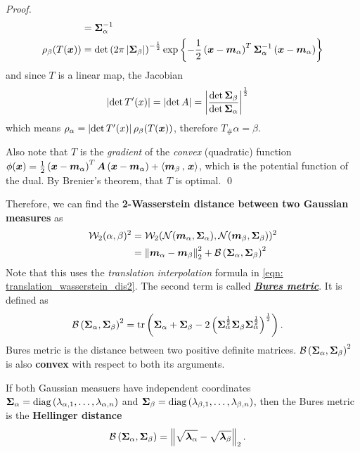 \documentclass[11pt]{article}
\begin{document}
\begin{itemize}
\begin{proof}
\begin{align*}
&=\boldsymbol{\Sigma}_{\alpha}^{-1}\\
\rho_{\beta}(T(\boldsymbol{x})) &= \det\left(2\pi\left\lvert \boldsymbol{\Sigma}_{\beta} \right\rvert\right)^{-\frac{1}{2}}\exp\left\{-\frac{1}{2}\left(\boldsymbol{x} - \boldsymbol{m}_{\alpha}\right)^{T}\boldsymbol{\Sigma}_{\alpha}^{-1}\left(\boldsymbol{x} - \boldsymbol{m}_{\alpha}\right) \right\}
\end{align*} and since $T$ is a linear map, the Jacobian
\begin{align*}
\left\lvert \det{T'(x)} \right\rvert &= \left\lvert \det{A} \right\rvert = \left\lvert \frac{\det{\boldsymbol{\Sigma}_{\beta}}}{\det{\boldsymbol{\Sigma}_{\alpha}}} \right\rvert^{\frac{1}{2}}
\end{align*} which means $\rho_{\alpha} = \left\lvert \det{T'(x)} \right\rvert\rho_{\beta}(T(\boldsymbol{x}))$, therefore $T_{\#}\alpha = \beta$.

Also note that $T$ is the \emph{gradient} of the \emph{convex} (quadratic) function $\phi(\boldsymbol{x}) = \frac{1}{2}\left(\boldsymbol{x} - \boldsymbol{m}_{\alpha}\right)^{T}\boldsymbol{A}\left(\boldsymbol{x} - \boldsymbol{m}_{\alpha}\right) + \left\langle \boldsymbol{m}_{\beta}\,,\, \boldsymbol{x} \right\rangle$, which is the potential function of the dual. By Brenier's theorem, that $T$ is optimal. \qed
\end{proof}

Therefore, we can find the \textbf{2-Wasserstein distance between two Gaussian measures} as 
\begin{align}
{\mathcal W}_{2}(\alpha, \beta)^2 &=  {\mathcal W}_{2}( {\mathcal N}(\boldsymbol{m}_{\alpha}, \boldsymbol{\Sigma}_{\alpha}), {\mathcal N}(\boldsymbol{m}_{\beta}, \boldsymbol{\Sigma}_{\beta}))^2 \nonumber\\
&= \left\|\boldsymbol{m}_{\alpha} - \boldsymbol{m}_{\beta}\right\|_{2}^{2} + {\mathcal B}\left(\boldsymbol{\Sigma}_{\alpha}, \boldsymbol{\Sigma}_{\beta}\right)^2 \label{eqn: 2_wasserstein_gaussian}
\end{align} Note that this uses the \emph{translation interpolation} formula in \eqref{eqn: translation_wasserstein_dis2}. The second term is called \underline{\emph{\textbf{Bures metric}}}. It is defined as 
\begin{align}
{\mathcal B}\left(\boldsymbol{\Sigma}_{\alpha}, \boldsymbol{\Sigma}_{\beta}\right)^2 &= \mathrm{tr}\left(\boldsymbol{\Sigma}_{\alpha} + \boldsymbol{\Sigma}_{\beta} - 2\left( \boldsymbol{\Sigma}_{\alpha}^{\frac{1}{2}}\boldsymbol{\Sigma}_{\beta}\boldsymbol{\Sigma}_{\alpha}^{\frac{1}{2}}\right)^{\frac{1}{2}} \right).  \label{eqn: bures_metric}
\end{align} Bures metric is the distance between two positive definite matrices. ${\mathcal B}\left(\boldsymbol{\Sigma}_{\alpha}, \boldsymbol{\Sigma}_{\beta}\right)^2$ is also \textbf{convex} with respect to both its arguments.

If both Gaussian measuers have independent coordinates $\boldsymbol{\Sigma}_{\alpha} = \text{diag}\left(\lambda_{\alpha,1}, \ldots, \lambda_{\alpha,n}\right)$ and $\boldsymbol{\Sigma}_{\beta} = \text{diag}\left(\lambda_{\beta,1}, \ldots, \lambda_{\beta,n}\right)$, then the Bures metric is the \textbf{Hellinger distance}
\begin{align}
{\mathcal B}\left(\boldsymbol{\Sigma}_{\alpha}, \boldsymbol{\Sigma}_{\beta}\right) &= \left\|\sqrt{\boldsymbol{\lambda}_{\alpha}} - \sqrt{\boldsymbol{\lambda}_{\beta}}\right\|_{2}. \label{eqn: bures_metric_independent}
\end{align}


\end{itemize}
\end{document}
